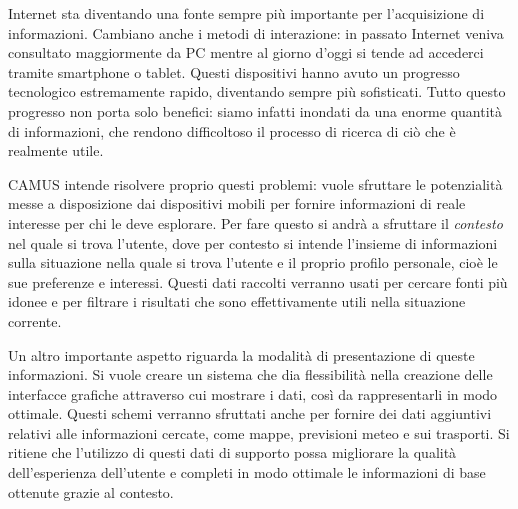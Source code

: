 Internet sta diventando una fonte sempre più importante per l'acquisizione di informazioni. Cambiano anche i metodi di interazione: in passato Internet veniva consultato maggiormente da PC mentre al giorno d'oggi si tende ad accederci tramite smartphone o tablet. Questi dispositivi hanno avuto un progresso tecnologico estremamente rapido, diventando sempre più sofisticati. Tutto questo progresso non porta solo benefici: siamo infatti inondati da una enorme quantità di informazioni, che rendono difficoltoso il processo di ricerca di ciò che è realmente utile.

CAMUS intende risolvere proprio questi problemi: vuole sfruttare le potenzialità messe a disposizione dai dispositivi mobili per fornire informazioni di reale interesse per chi le deve esplorare. Per fare questo si andrà a sfruttare il \emph{contesto} nel quale si trova l'utente, dove per contesto si intende l'insieme di informazioni sulla situazione nella quale si trova l'utente e il proprio profilo personale, cioè le sue preferenze e interessi. Questi dati raccolti verranno usati per cercare fonti più idonee e per filtrare i risultati che sono effettivamente utili nella situazione corrente.

Un altro importante aspetto riguarda la modalità di presentazione di queste informazioni. Si vuole creare un sistema che dia flessibilità nella creazione delle interfacce grafiche attraverso cui mostrare i dati, così da rappresentarli in modo ottimale. Questi schemi verranno sfruttati anche per fornire dei dati aggiuntivi relativi alle informazioni cercate, come mappe, previsioni meteo e sui trasporti. Si ritiene che l'utilizzo di questi dati di supporto possa migliorare la qualità dell'esperienza dell'utente e completi in modo ottimale le informazioni di base ottenute grazie al contesto.